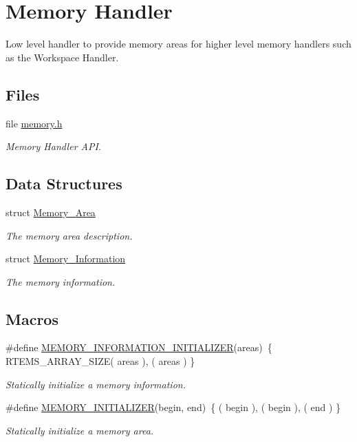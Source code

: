 \hypertarget{group__RTEMSScoreMemory}{}\section{Memory Handler}
\label{group__RTEMSScoreMemory}


Low level handler to provide memory areas for higher level memory handlers such as the Workspace Handler.  


\subsection*{Files}
\begin{DoxyCompactItemize}
\item 
file \mbox{\hyperlink{rtems_2score_2memory_8h}{memory.\+h}}
\begin{DoxyCompactList}\small\item\em Memory Handler A\+PI. \end{DoxyCompactList}\end{DoxyCompactItemize}
\subsection*{Data Structures}
\begin{DoxyCompactItemize}
\item 
struct \mbox{\hyperlink{structMemory__Area}{Memory\+\_\+\+Area}}
\begin{DoxyCompactList}\small\item\em The memory area description. \end{DoxyCompactList}\item 
struct \mbox{\hyperlink{structMemory__Information}{Memory\+\_\+\+Information}}
\begin{DoxyCompactList}\small\item\em The memory information. \end{DoxyCompactList}\end{DoxyCompactItemize}
\subsection*{Macros}
\begin{DoxyCompactItemize}
\item 
\#define \mbox{\hyperlink{group__RTEMSScoreMemory_gad5ba07c8e4e2f284f226c106cf28b8eb}{M\+E\+M\+O\+R\+Y\+\_\+\+I\+N\+F\+O\+R\+M\+A\+T\+I\+O\+N\+\_\+\+I\+N\+I\+T\+I\+A\+L\+I\+Z\+ER}}(areas)~\{ R\+T\+E\+M\+S\+\_\+\+A\+R\+R\+A\+Y\+\_\+\+S\+I\+ZE( areas ), ( areas ) \}
\begin{DoxyCompactList}\small\item\em Statically initialize a memory information. \end{DoxyCompactList}\item 
\#define \mbox{\hyperlink{group__RTEMSScoreMemory_ga8f4d5c0a6320c86845b6162782305b25}{M\+E\+M\+O\+R\+Y\+\_\+\+I\+N\+I\+T\+I\+A\+L\+I\+Z\+ER}}(begin,  end)~\{ ( begin ), ( begin ), ( end ) \}
\begin{DoxyCompactList}\small\item\em Statically initialize a memory area. \end{DoxyCompactList}\end{DoxyCompactItemize}
